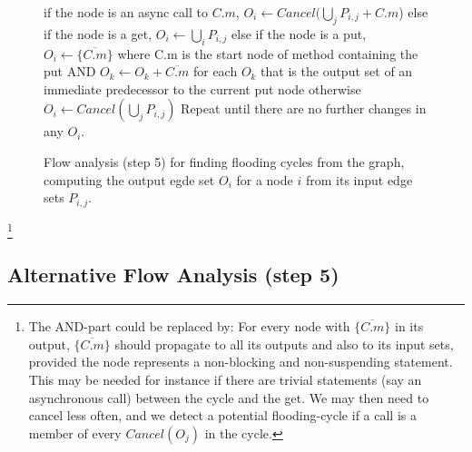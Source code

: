 \documentclass[12pt]{article}%
\begin{document}
\begin{figure}
\begin{shaded}
if the node is an async call to $C.m$, $O_i \leftarrow Cancel(\bigcup_j P_{i,j} + C.m$)\newline
else if the node is a get, $O_i \leftarrow \bigcup_i P_{i,j}$\newline
else if the node is a put, \newline
\hspace*{.5cm}  $O_i \leftarrow \{ \overline{C.m} \}$ where C.m is the start node of method containing the put\newline
AND $O_k \leftarrow O_k + \overline{C.m}$ for each $O_k$ that is the output set of an immediate predecessor to the current put node\newline
otherwise $O_i \leftarrow Cancel(\bigcup_j P_{i,j})$\newline
Repeat until there are no further changes in any $O_i$.%
\end{shaded}%
\caption{\label{step5}%
Flow analysis (step 5) for finding flooding cycles from the graph,
computing the output egde set $O_i$ for a node $i$ from its input edge sets 
$P_{i,j}$.
}
\end{figure}
\footnote{The AND-part could be replaced by:
For every node with $\{ \overline{C.m} \}$ in its output,
$\{ \overline{C.m} \}$ should propagate to all its outputs and also to its input sets, 
provided the node represents a  non-blocking and non-suspending statement.
This may be needed for instance if there are 
trivial statements (say an asynchronous call)
between the cycle and the get.
We may then need to cancel less often,
and we detect a potential flooding-cycle if a call
is a member of every  $Cancel(O_j)$ in the cycle.
}
\subsection{Alternative Flow Analysis (step 5)}
\end{document}
